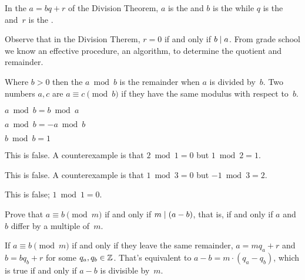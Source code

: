 \documentclass{ibl}
\begin{document}
\begin{df}
In the  $a=bq+r$ of the Division Theorem, 
$a$ is the  and
$b$ is the  while 
$q$ is the  and~$r$ is the .  
\end{df}

Observe that in the Division Therem, $r=0$ if and only if $b\mid a$. 
From grade school we know an effective procedure, an algorithm, to 
determine the quotient and remainder.

\begin{df}
Where $b>0$ then the  $a\bmod b$ 
is the remainder when $a$ is divided by~$b$.
Two numbers $a,c$ are  $a\equiv c\pmod b$ 
if they have the same modulus with respect to~$b$.
\end{df}

\begin{ex}\pord
\begin{exes}
\item $a\bmod b=b\bmod a$
\item $a\bmod b=-a\bmod b$
\item $b\bmod b=1$    
\end{exes}
\begin{ans}
\begin{exes}
\item This is false.
  A counterexample is that $2\bmod 1=0$ but $1\bmod 2=1$.
\item This is false.
  A counterexample is that $1\bmod 3=0$ but $-1\bmod 3=2$.
\item This is false;
  $1\bmod 1=0$.     
\end{exes}
\end{ans}
\end{ex}

\begin{ex}
Prove that $a\equiv b\pmod m$ if and only if $m\mid (a-b)$,
that is, if and only if $a$ and~$b$ differ by a multiple of~$m$.  
\begin{ans}
If $a\equiv b\pmod m$ if and only if they leave the same remainder,
$a=mq_a+r$ and~$b=bq_b+r$ for some $q_a,q_b\in\mathbb{Z}$.
That's equivalent to $a-b=m\cdot(q_a-q_b)$, 
which is true if and only if $a-b$ is divisible by~$m$.
\end{ans}
\end{ex}
\end{document}
